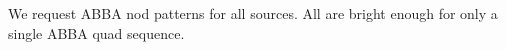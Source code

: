 \documentclass[11pt]{article}
\begin{document}
{%

%

\technicaldescription


We request ABBA nod patterns for all sources.  All are bright enough for only a single ABBA quad sequence.



\bandthreeplan




}
\end{document}
